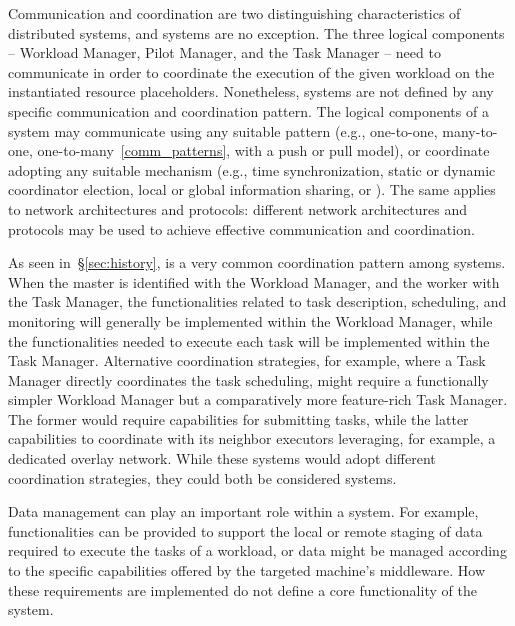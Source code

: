 \documentclass{sig-alternate}
\begin{document}
Communication and coordination are two distinguishing characteristics of
distributed systems, and \pilotjob systems are no exception. The three logical
components -- Workload Manager, Pilot Manager, and the Task Manager -- need to
communicate in order to coordinate the execution of the given workload on the
instantiated resource placeholders.  Nonetheless, \pilotjob systems are not
defined by any specific communication and coordination pattern. The logical
components of a \pilotjob system may communicate using any suitable pattern
(e.g., one-to-one, many-to-one, one-to-many~\ref{comm_patterns}, with a push or
pull model), or coordinate adopting any suitable mechanism (e.g., time
synchronization, static or dynamic coordinator election, local or global
information sharing, or \MW). The same applies to network architectures and
protocols: different network architectures and protocols may be used to achieve
effective communication and coordination.


As seen in~\S\ref{sec:history}, \MW is a very common coordination pattern among
\pilotjob systems. When the master is identified with the Workload Manager, and
the worker with the Task Manager, the functionalities related to task
description, scheduling, and monitoring will generally be implemented within the
Workload Manager, while the functionalities needed to execute each task will be
implemented within the Task Manager. Alternative coordination strategies, for
example, where a Task Manager directly coordinates the task scheduling, might
require a functionally simpler Workload Manager but a comparatively more
feature-rich Task Manager. The former would require capabilities for submitting
tasks, while the latter capabilities to coordinate with its neighbor executors
leveraging, for example, a dedicated overlay network. While these systems would
adopt different coordination strategies, they could both be considered \pilotjob
systems.


Data management can play an important role within a \pilotjob system. For
example, functionalities can be provided to support the local or remote staging
of data required to execute the tasks of a workload, or data might be managed
according to the specific capabilities offered by the targeted machine's
middleware. How these requirements are implemented do not define a core
functionality of the \pilot system.
\end{document}
